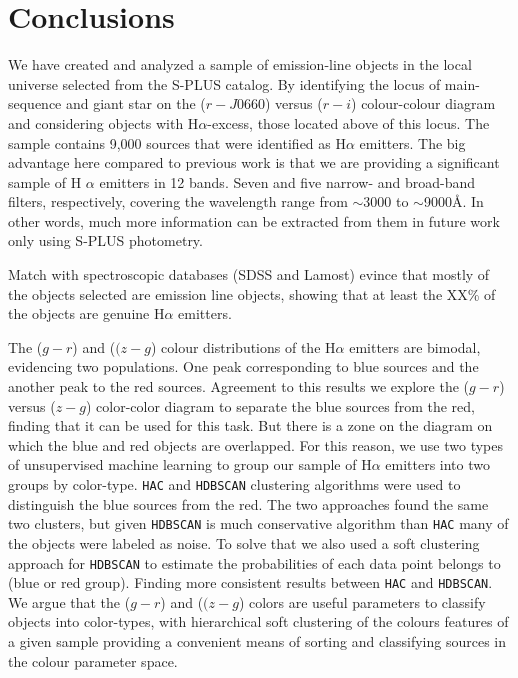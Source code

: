 \documentclass[fleqn,usenatbib]{mnras}
\begin{document}
\section{Conclusions}
\label{sec:conclu}

We have created and analyzed a sample of emission-line objects in the 
local universe selected from the S-PLUS catalog.
By identifying the locus of main-sequence and giant star on the ($r - J0660$) versus ($r - i$) 
colour-colour diagram and considering objects 
with H$\alpha$-excess, those located above of this locus. 
The sample contains 9,000 sources that were identified as H{$\alpha$} emitters.
The big advantage here compared to previous work is that we are providing a significant 
sample of H $\alpha$ emitters in 12 bands. Seven and five narrow- and broad-band filters,
respectively, covering the wavelength range from $\sim$3000 to $\sim$9000\AA. 
In other words, much more information can be extracted from them in future work only using S-PLUS photometry. 

Match with spectroscopic databases (SDSS and Lamost) evince that mostly of the objects 
selected are emission line objects, showing  that at least the XX\% of the objects are 
genuine H$\alpha$ emitters. 

The ($g - r$) and ($(z - g$) colour distributions of the H{$\alpha$} emitters are bimodal, 
evidencing two populations. One peak corresponding to blue sources and the another peak to the 
red sources. Agreement to this results we explore the ($g - r$) versus ($z - g$) color-color diagram 
to separate the blue sources from the red, finding that it can be used for this task. But there is a zone 
on the diagram on which the blue and red objects are overlapped. 
For this reason, we use two types of unsupervised machine learning to group our sample of H{$\alpha$} 
emitters into two groups by color-type. \texttt{HAC} and \texttt{HDBSCAN} clustering algorithms were 
used to distinguish the blue sources from the red. The two approaches found the same two clusters, 
but given \texttt{HDBSCAN} is much conservative algorithm than  \texttt{HAC}
many of the objects were labeled as noise. To solve that we also used a soft clustering approach 
for \texttt{HDBSCAN} to estimate the probabilities of each data point belongs to (blue or red group). 
Finding more consistent results between \texttt{HAC} and \texttt{HDBSCAN}. We argue that
the ($g - r$) and ($(z - g$) colors are useful parameters to classify objects into color-types,
with hierarchical soft clustering of the colours features of a given sample providing a 
convenient means of sorting and classifying sources in the colour parameter space. 
\end{document}
